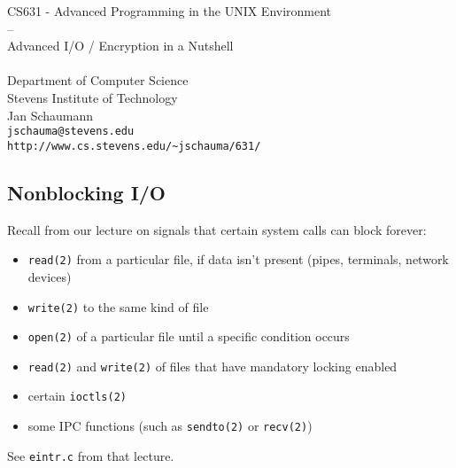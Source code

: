 \documentclass[xga]{xdvislides}
\begin{document}
\setfontphv

\lhead{\slidetitle}
\cfoot{\relax}
\rfoot{\Gray{\today}}

\vspace*{\fill}
\begin{center}
	\Hugesize
		CS631 - Advanced Programming in the UNIX Environment\\
		-- \\
		Advanced I/O / Encryption in a Nutshell \\
	\hspace*{5mm}\blueline\\ [1em]
	\Normalsize
		Department of Computer Science\\
		Stevens Institute of Technology\\
		Jan Schaumann\\
		\verb+jschauma@stevens.edu+\\
		\verb+http://www.cs.stevens.edu/~jschauma/631/+
\end{center}
\vspace*{\fill}

\subsection{Nonblocking I/O}
Recall from our lecture on signals that certain system calls can block forever:
\begin{itemize}
	\item {\tt read(2)} from a particular file, if data isn't present (pipes,
		terminals, network devices)
	\item {\tt write(2)} to the same kind of file
	\item {\tt open(2)} of a particular file until a specific condition occurs
	\item {\tt read(2)} and {\tt write(2)} of files that have mandatory
		locking enabled
	\item certain {\tt ioctls(2)}
	\item some IPC functions (such as {\tt sendto(2)} or {\tt recv(2)})
\end{itemize}
\vspace{.25in}
See {\tt eintr.c} from that lecture.
\end{document}

